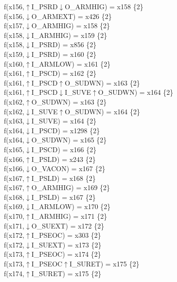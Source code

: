 f(x156,$\uparrow$I\_PSRD$\downarrow$O\_ARMHIG) = x158 \{2\} \\  
f(x156,$\downarrow$O\_ARMEXT) = x426 \{2\} \\  
f(x157,$\downarrow$O\_ARMHIG) = x158 \{2\} \\  
f(x158,$\downarrow$I\_ARMHIG) = x159 \{2\} \\  
f(x158,$\downarrow$I\_PSRD) = x856 \{2\} \\  
f(x159,$\downarrow$I\_PSRD) = x160 \{2\} \\  
f(x160,$\uparrow$I\_ARMLOW) = x161 \{2\} \\  
f(x161,$\uparrow$I\_PSCD) = x162 \{2\} \\  
f(x161,$\uparrow$I\_PSCD$\uparrow$O\_SUDWN) = x163 \{2\} \\  
f(x161,$\uparrow$I\_PSCD$\downarrow$I\_SUVE$\uparrow$O\_SUDWN) = x164 \{2\} \\  
f(x162,$\uparrow$O\_SUDWN) = x163 \{2\} \\  
f(x162,$\downarrow$I\_SUVE$\uparrow$O\_SUDWN) = x164 \{2\} \\  
f(x163,$\downarrow$I\_SUVE) = x164 \{2\} \\  
f(x164,$\downarrow$I\_PSCD) = x1298 \{2\} \\  
f(x164,$\downarrow$O\_SUDWN) = x165 \{2\} \\  
f(x165,$\downarrow$I\_PSCD) = x166 \{2\} \\  
f(x166,$\uparrow$I\_PSLD) = x243 \{2\} \\  
f(x166,$\downarrow$O\_VACON) = x167 \{2\} \\  
f(x167,$\uparrow$I\_PSLD) = x168 \{2\} \\  
f(x167,$\uparrow$O\_ARMHIG) = x169 \{2\} \\  
f(x168,$\downarrow$I\_PSLD) = x167 \{2\} \\  
f(x169,$\downarrow$I\_ARMLOW) = x170 \{2\} \\  
f(x170,$\uparrow$I\_ARMHIG) = x171 \{2\} \\  
f(x171,$\downarrow$O\_SUEXT) = x172 \{2\} \\  
f(x172,$\uparrow$I\_PSEOC) = x303 \{2\} \\  
f(x172,$\downarrow$I\_SUEXT) = x173 \{2\} \\  
f(x173,$\uparrow$I\_PSEOC) = x174 \{2\} \\  
f(x173,$\uparrow$I\_PSEOC$\uparrow$I\_SURET) = x175 \{2\} \\  
f(x174,$\uparrow$I\_SURET) = x175 \{2\} \\  
